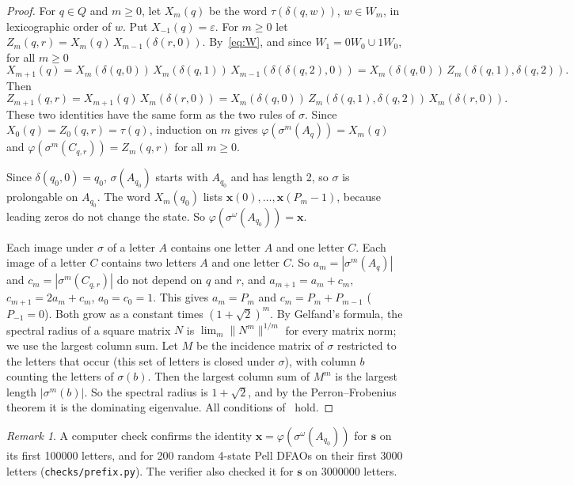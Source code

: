 \documentclass[11pt]{article}
\theoremstyle{definition}
\theoremstyle{remark}
\newtheorem{remark}[theorem]{Remark}
\newcommand{\PSQ}{\mathbf{s}}
\begin{document}
\begin{proof}
For $q \in Q$ and $m \ge 0$, let $X_m(q)$ be the word $\tau(\delta(q, w))$, $w \in W_m$, in lexicographic order of $w$. Put $X_{-1}(q) = \varepsilon$. For $m \ge 0$ let $Z_m(q, r) = X_m(q)\, X_{m-1}(\delta(r, 0))$. By~\eqref{eq:W}, and since $W_1 = 0W_0 \cup 1W_0$, for all $m \ge 0$
\[
X_{m+1}(q) = X_m(\delta(q,0))\, X_m(\delta(q,1))\, X_{m-1}(\delta(\delta(q,2), 0)) = X_m(\delta(q,0))\, Z_m(\delta(q,1), \delta(q,2)).
\]
Then
\[
Z_{m+1}(q, r) = X_{m+1}(q)\, X_m(\delta(r,0)) = X_m(\delta(q,0))\, Z_m(\delta(q,1), \delta(q,2))\, X_m(\delta(r,0)).
\]
These two identities have the same form as the two rules of $\sigma$. Since $X_0(q) = Z_0(q, r) = \tau(q)$, induction on $m$ gives $\varphi(\sigma^m(A_q)) = X_m(q)$ and $\varphi(\sigma^m(C_{q,r})) = Z_m(q,r)$ for all $m \ge 0$.

Since $\delta(q_0, 0) = q_0$, $\sigma(A_{q_0})$ starts with $A_{q_0}$ and has length 2, so $\sigma$ is prolongable on $A_{q_0}$. The word $X_m(q_0)$ lists $\mathbf{x}(0), \dots, \mathbf{x}(P_m - 1)$, because leading zeros do not change the state. So $\varphi(\sigma^\omega(A_{q_0})) = \mathbf{x}$.

Each image under $\sigma$ of a letter $A$ contains one letter $A$ and one letter $C$. Each image of a letter $C$ contains two letters $A$ and one letter $C$. So $a_m = |\sigma^m(A_q)|$ and $c_m = |\sigma^m(C_{q,r})|$ do not depend on $q$ and $r$, and $a_{m+1} = a_m + c_m$, $c_{m+1} = 2a_m + c_m$, $a_0 = c_0 = 1$. This gives $a_m = P_m$ and $c_m = P_m + P_{m-1}$ ($P_{-1} = 0$). Both grow as a constant times $(1+\sqrt{2})^m$. By Gelfand's formula, the spectral radius of a square matrix $N$ is $\lim_m \|N^m\|^{1/m}$ for every matrix norm; we use the largest column sum. Let $M$ be the incidence matrix of $\sigma$ restricted to the letters that occur (this set of letters is closed under $\sigma$), with column $b$ counting the letters of $\sigma(b)$. Then the largest column sum of $M^m$ is the largest length $|\sigma^m(b)|$. So the spectral radius is $1 + \sqrt{2}$, and by the Perron--Frobenius theorem it is the dominating eigenvalue. All conditions of~\cite[Definition~2]{Durand} hold.
\end{proof}

\begin{remark}
A computer check confirms the identity $\mathbf{x} = \varphi(\sigma^\omega(A_{q_0}))$ for $\PSQ$ on its first 100000 letters, and for 200 random 4-state Pell DFAOs on their first 3000 letters (\texttt{checks/prefix.py}). The verifier also checked it for $\PSQ$ on 3000000 letters.
\end{remark}
\end{document}
